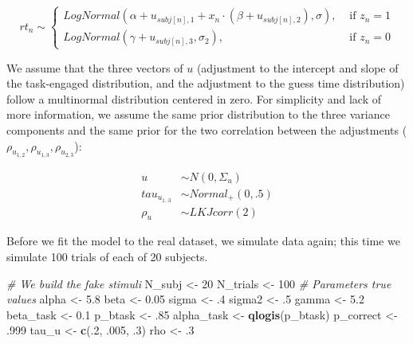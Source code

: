 \documentclass[12pt,]{krantz}
\newenvironment{Shaded}{\begin{snugshade}}{\end{snugshade}}
\newcommand{\KeywordTok}[1]{\textcolor[rgb]{0.13,0.29,0.53}{\textbf{#1}}}
\newcommand{\DecValTok}[1]{\textcolor[rgb]{0.00,0.00,0.81}{#1}}
\newcommand{\FloatTok}[1]{\textcolor[rgb]{0.00,0.00,0.81}{#1}}
\newcommand{\StringTok}[1]{\textcolor[rgb]{0.31,0.60,0.02}{#1}}
\newcommand{\CommentTok}[1]{\textcolor[rgb]{0.56,0.35,0.01}{\textit{#1}}}
\newcommand{\NormalTok}[1]{#1}
\theoremstyle{definition}
\theoremstyle{definition}
\theoremstyle{definition}
\theoremstyle{remark}
\begin{document}
\begin{equation}
rt_n \sim 
\begin{cases}
LogNormal(\alpha + u_{subj[n],1} +  x_n \cdot  (\beta +  u_{subj[n], 2}), \sigma), & \text{ if } z_n =1 \\
LogNormal(\gamma + u_{subj[n], 3}, \sigma_2), & \text{ if } z_n=0
\end{cases}
\end{equation}

We assume that the three vectors of \(u\) (adjustment to the intercept
and slope of the task-engaged distribution, and the adjustment to the
guess time distribution) follow a multinormal distribution centered in
zero. For simplicity and lack of more information, we assume the same
prior distribution to the three variance components and the same prior
for the two correlation between the adjustments
(\(\rho_{u_{1,2}}, \rho_{u_{1,3}}, \rho_{u_{2,3}}\)):

\begin{equation}
\begin{aligned}
u &\sim N(0, \Sigma_u)\\
tau_{u_{1..3}} & \sim  Normal_+(0, .5)\\
\rho_u &\sim LKJcorr(2) 
\end{aligned}
\end{equation}

Before we fit the model to the real dataset, we simulate data again;
this time we simulate 100 trials of each of 20 subjects.

\begin{Shaded}
\begin{Highlighting}[]
\CommentTok{# We build the fake stimuli}
\NormalTok{N_subj <-}\StringTok{ }\DecValTok{20}
\NormalTok{N_trials <-}\StringTok{ }\DecValTok{100}
\CommentTok{# Parameters true values}
\NormalTok{alpha <-}\StringTok{ }\FloatTok{5.8}
\NormalTok{beta <-}\StringTok{ }\FloatTok{0.05}
\NormalTok{sigma <-}\StringTok{ }\FloatTok{.4}
\NormalTok{sigma2 <-}\StringTok{ }\FloatTok{.5}
\NormalTok{gamma <-}\StringTok{ }\FloatTok{5.2}
\NormalTok{beta_task <-}\StringTok{ }\FloatTok{0.1}
\NormalTok{p_btask <-}\StringTok{ }\FloatTok{.85}
\NormalTok{alpha_task <-}\StringTok{ }\KeywordTok{qlogis}\NormalTok{(p_btask)}
\NormalTok{p_correct <-}\StringTok{ }\FloatTok{.999}
\NormalTok{tau_u <-}\StringTok{ }\KeywordTok{c}\NormalTok{(.}\DecValTok{2}\NormalTok{, }\FloatTok{.005}\NormalTok{, }\FloatTok{.3}\NormalTok{)}
\NormalTok{rho <-}\StringTok{ }\FloatTok{.3}
\end{Highlighting}
\end{Shaded}
\end{document}
